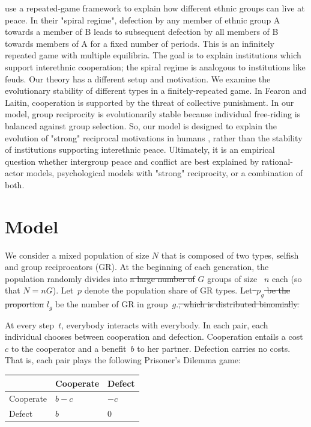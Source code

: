 \documentclass[12pt,a4paper]{article}
\newcommand{\mm}[1]{{\color{red} #1}}
\begin{document}
\textcite{fearon1996explaining} use a repeated-game framework to explain how
different ethnic groups can live at peace. In their "spiral regime", defection
by any member of ethnic group A towards a member of B leads to subsequent 
defection by all members of B towards members of A for a fixed number of periods.
This is an infinitely repeated game with multiple equilibria. The goal is to explain
institutions which support interethnic cooperation; the spiral regime is analogous
to institutions like feuds. Our theory has a different setup and motivation. 
We examine the evolutionary stability of different types in a finitely-repeated game. 
In Fearon and Laitin, cooperation is supported by the threat of collective 
punishment. In our model, group reciprocity is evolutionarily stable because 
individual free-riding is balanced against group selection. So, our model
is designed to explain the evolution of "strong" reciprocal
motivations in humans \parencite{gintis2000strong}, rather than the 
stability of institutions supporting interethnic peace. Ultimately, it is an 
empirical question whether intergroup peace and conflict are best explained 
by rational-actor models, psychological models with "strong" reciprocity,
or a combination of both.

\section{Model}

We consider a mixed population of \mm{size $N$ that is composed of }two types, selfish and group reciprocators (GR). At the beginning of each generation, the population randomly divides into \sout{a large number of} \mm{$G$} groups of size~\mm{$n$} each \mm{(so that $N=nG$)}.
Let~$p$ denote the population share of GR types. 
Let\sout{~$p_g$ be the proportion} \mm{$l_g$ be the number} of GR in group~$g$.\sout{, which is distributed binomially.}

At every step~$t$, everybody interacts with everybody. In each pair, each individual chooses between cooperation and defection. Cooperation entails a cost~$c$ to the cooperator and a benefit~$b$ to her partner. Defection carries no costs. That is, each pair plays the following Prisoner's Dilemma game:
\begin{center}
    \begin{tabularx}{0.5\textwidth}{|x|x|x|}
        \hline
        &   Cooperate   &   Defect  \\
        \hline
        Cooperate   &   $b-c$   &   $-c$    \\
        \hline
        Defect  &   $b$ &   $0$   \\
        \hline
    \end{tabularx}
\end{center}
\end{document}
